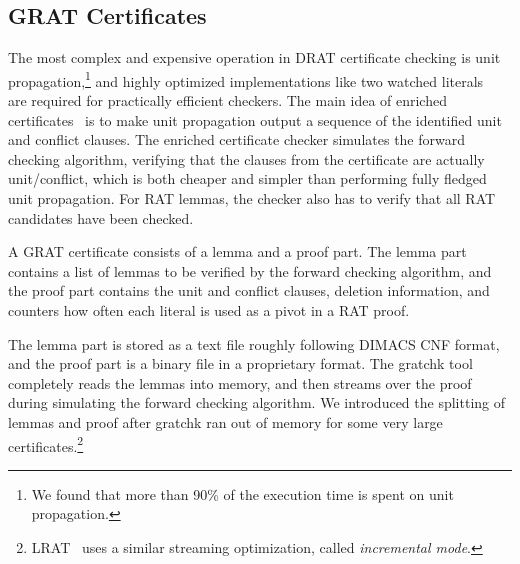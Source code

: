 \documentclass{llncs}
\begin{document}
\subsection{GRAT Certificates}

The most complex and expensive operation in DRAT certificate checking is unit propagation,\footnote{We found that more than 90\% of the execution time is spent on unit propagation.}
and highly optimized implementations like two watched literals~\cite{MMZZ01} are required for practically efficient checkers.
The main idea of enriched certificates~\cite{CMS17} is to make unit propagation output a sequence of the identified unit and conflict clauses. 
The enriched certificate checker simulates the forward checking algorithm, verifying that the clauses from the certificate are actually unit/conflict,
which is both cheaper and simpler than performing fully fledged unit propagation.
For RAT lemmas, the checker also has to verify that all RAT candidates have been checked.





A GRAT certificate consists of a lemma and a proof part. 
The lemma part contains a list of lemmas to be verified by the forward checking algorithm,
and the proof part contains the unit and conflict clauses, deletion information, and counters how often each literal is used as a pivot in a RAT proof.

The lemma part is stored as a text file roughly following DIMACS CNF format, and the proof part is a binary file in a proprietary format.
The gratchk tool completely reads the lemmas into memory, and then streams over the proof during simulating the forward checking algorithm.
We introduced the splitting of lemmas and proof after gratchk ran out of memory for some very large certificates.\footnote{LRAT~\cite{HHKW17} uses a similar streaming optimization, called \emph{incremental mode}.}
\end{document}

